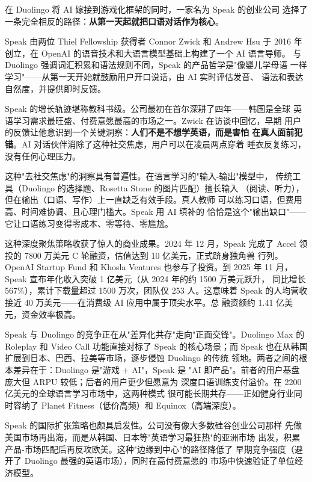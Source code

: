 在 Duolingo 将 AI 嫁接到游戏化框架的同时，一家名为 Speak 的创业公司
选择了一条完全相反的路径：\textbf{从第一天起就把口语对话作为核心}。

Speak 由两位 Thiel Fellowship 获得者 Connor Zwick 和 Andrew Hsu 于 2016
年创立，在 OpenAI 的语音技术和大语言模型基础上构建了一个 AI 语言导师。
与 Duolingo 强调词汇积累和语法规则不同，Speak 的产品哲学是"像婴儿学母语
一样学习"——从第一天开始就鼓励用户开口说话，由 AI 实时评估发音、
语法和表达自然度，并提供即时反馈。

Speak 的增长轨迹堪称教科书级。公司最初在首尔深耕了四年——韩国是全球
英语学习需求最旺盛、付费意愿最高的市场之一。Zwick 在访谈中回忆，早期
用户的反馈让他意识到一个关键洞察：\textbf{人们不是不想学英语，而是害怕
在真人面前犯错}。AI 对话伙伴消除了这种社交焦虑，用户可以在凌晨两点穿着
睡衣反复练习，没有任何心理压力。

这种"去社交焦虑"的洞察具有普遍性。在语言学习的"输入-输出"模型中，
传统工具（Duolingo 的选择题、Rosetta Stone 的图片匹配）擅长输入
（阅读、听力），但在输出（口语、写作）上一直缺乏有效手段。真人教师
可以练习口语，但费用高、时间难协调、且心理门槛大。Speak 用 AI 填补的
恰恰是这个"输出缺口"——它让口语练习变得零成本、零等待、零尴尬。

这种深度聚焦策略收获了惊人的商业成果。2024 年 12 月，Speak 完成了
Accel 领投的 7800 万美元 C 轮融资，估值达到 10 亿美元，正式跻身独角兽
行列。OpenAI Startup Fund 和 Khosla Ventures 也参与了投资。到 2025 年
11 月，Speak 宣布年化收入突破 1 亿美元（从 2024 年的约 1500 万美元跃升，
同比增长 567\%），累计下载量超过 1500 万次，团队仅 253 人。这意味着
Speak 的人均营收接近 40 万美元——在消费级 AI 应用中属于顶尖水平。总
融资额约 1.41 亿美元，资金效率极高。

Speak 与 Duolingo 的竞争正在从"差异化共存"走向"正面交锋"。Duolingo
Max 的 Roleplay 和 Video Call 功能直接对标了 Speak 的核心场景；而 Speak
也在从韩国扩展到日本、巴西、拉美等市场，逐步侵蚀 Duolingo 的传统
领地。两者之间的根本差异在于：Duolingo 是"游戏 + AI"，Speak 是
"AI 即产品"。前者的用户基盘庞大但 ARPU 较低；后者的用户更少但愿意为
深度口语训练支付溢价。在 2200 亿美元的全球语言学习市场中，这两种模式
很可能长期共存——正如健身行业同时容纳了 Planet Fitness（低价高频）和
Equinox（高端深度）。

Speak 的国际扩张策略也颇具启发性。公司没有像大多数硅谷创业公司那样
先做美国市场再出海，而是从韩国、日本等"英语学习最狂热"的亚洲市场
出发，积累产品-市场匹配后再反攻欧美。这种"边缘到中心"的路径降低了
早期竞争强度（避开了 Duolingo 最强的英语市场），同时在高付费意愿的
市场中快速验证了单位经济模型。


